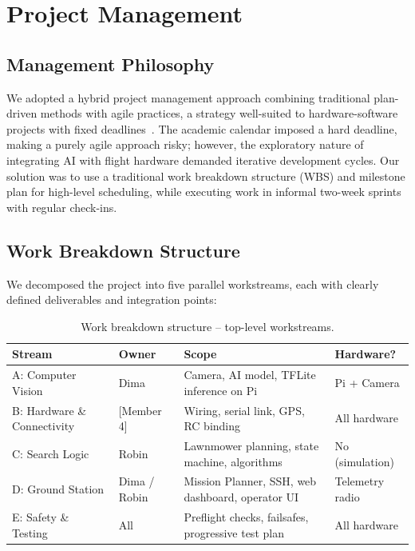 \section{Project Management}
\label{sec:project_management}

\subsection{Management Philosophy}

We adopted a hybrid project management approach combining traditional plan-driven methods with agile practices, a strategy well-suited to hardware-software projects with fixed deadlines~\cite{pmbok2021, boehm1988spiral}. The academic calendar imposed a hard deadline, making a purely agile approach risky; however, the exploratory nature of integrating AI with flight hardware demanded iterative development cycles. Our solution was to use a traditional work breakdown structure (WBS) and milestone plan for high-level scheduling, while executing work in informal two-week sprints with regular check-ins.

\subsection{Work Breakdown Structure}

We decomposed the project into five parallel workstreams, each with clearly defined deliverables and integration points:

\begin{table}[htbp]
\centering
\compactTable
\caption{Work breakdown structure -- top-level workstreams.}
\label{tab:wbs}
\begin{tabularx}{\linewidth}{l l X l}
\toprule
\textbf{Stream} & \textbf{Owner} & \textbf{Scope} & \textbf{Hardware?} \\
\midrule
A: Computer Vision & Dima & Camera, AI model, TFLite inference on Pi & Pi + Camera \\
B: Hardware \& Connectivity & [Member 4] & Wiring, serial link, GPS, RC binding & All hardware \\
C: Search Logic & Robin & Lawnmower planning, state machine, algorithms & No (simulation) \\
D: Ground Station & Dima / Robin & Mission Planner, SSH, web dashboard, operator UI & Telemetry radio \\
E: Safety \& Testing & All & Preflight checks, failsafes, progressive test plan & All hardware \\
\bottomrule
\end{tabularx}
\end{table}

